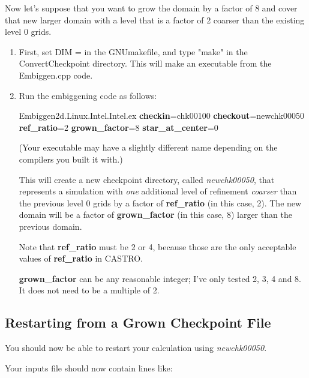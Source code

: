 Now let's suppose that you want to grow the domain by a factor of 8 and cover that
new larger domain with a level that is a factor of 2 coarser than the existing level 0 grids.

\begin{enumerate}

\item First, set DIM = in the GNUmakefile, and type  "make" in the ConvertCheckpoint directory.
This will make an executable from the Embiggen.cpp code.

\item Run the embiggening code as follows:

Embiggen2d.Linux.Intel.Intel.ex {\bf checkin}=chk00100 {\bf checkout}=newchk00050
{\bf ref\_ratio}=2 {\bf grown\_factor}=8 {\bf star\_at\_center}=0

(Your executable may have a slightly different name depending on the compilers you
built it with.)

This will create a new checkpoint directory, called {\it newchk00050}, that represents a simulation
with {\it one} additional level of refinement {\it coarser} than the previous level 0 grids by
a factor of {\bf ref\_ratio} (in this case, 2).   
The new domain will be a factor of {\bf grown\_factor} (in this case, 8) larger than the previous domain.

Note that {\bf ref\_ratio} must be 2 or 4, because those are the only acceptable values of {\bf ref\_ratio}
in CASTRO.

{\bf grown\_factor} can be any reasonable integer; I've only tested 2, 3, 4 and 8.  It does not need
to be a multiple of 2.

\end{enumerate}

\subsection{Restarting from a Grown Checkpoint File}

You should now be able to restart your calculation using {\em newchk00050}.

Your inputs file should now contain lines like:

